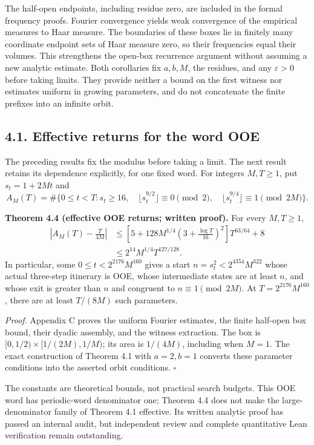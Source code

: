 \documentclass[11pt,a4paper]{article}
\begin{document}
The half-open endpoints, including residue zero, are included in the
formal frequency proofs. Fourier convergence yields weak convergence of
the empirical measures to Haar measure. The boundaries of these boxes
lie in finitely many coordinate endpoint sets of Haar measure zero, so
their frequencies equal their volumes. This strengthens the open-box
recurrence argument without assuming a new analytic estimate. Both
corollaries fix \(a,b,M\), the residues, and any \(\varepsilon>0\)
before taking limits. They provide neither a bound on the first witness
nor estimates uniform in growing parameters, and do not concatenate the
finite prefixes into an infinite orbit.

\subsection{4.1. Effective returns for the word
OOE}\label{effective-returns-for-the-word-ooe}

The preceding results fix the modulus before taking a limit. The next
result retains its dependence explicitly, for one fixed word. For
integers \(M,T\ge1\), put \(s_t=1+2Mt\) and \[
A_M(T)=\#\{0\le t<T:s_t\ge16,\quad
 \lfloor s_t^{9/2}\rfloor\equiv0\pmod2,\quad
 \lfloor s_t^{9/4}\rfloor\equiv1\pmod{2M}\}.
\]

\textbf{Theorem 4.4 (effective OOE returns; written proof).} For every
\(M,T\ge1\), \[
\begin{split}
\left|A_M(T)-\frac{T}{4M}\right|
&\le\left[5+128M^{1/4}\left(3+\frac{\log T}{16}\right)^2\right]T^{63/64}+8\\
&\le2^{14}M^{1/4}T^{127/128}.
\end{split}
\tag{4.7}
\] In particular, some \(0\le t<2^{2176}M^{160}\) gives a start
\(n=s_t^2<2^{4354}M^{322}\) whose actual three-step itinerary is OOE,
whose intermediate states are at least \(n\), and whose exit is greater
than \(n\) and congruent to \(n\equiv1\pmod{2M}\). At
\(T=2^{2176}M^{160}\), there are at least \(T/(8M)\) such parameters.

\emph{Proof.} Appendix C proves the uniform Fourier estimates, the
finite half-open box bound, their dyadic assembly, and the witness
extraction. The box is \([0,1/2)\times[1/(2M),1/M)\); its area is
\(1/(4M)\), including when \(M=1\). The exact construction of Theorem
4.1 with \(a=2,b=1\) converts these parameter conditions into the
asserted orbit conditions. \(\square\)

The constants are theoretical bounds, not practical search budgets. This
OOE word has periodic-word denominator one; Theorem 4.4 does not make
the large-denominator family of Theorem 4.1 effective. Its written
analytic proof has passed an internal audit, but independent review and
complete quantitative Lean verification remain outstanding.
\end{document}
